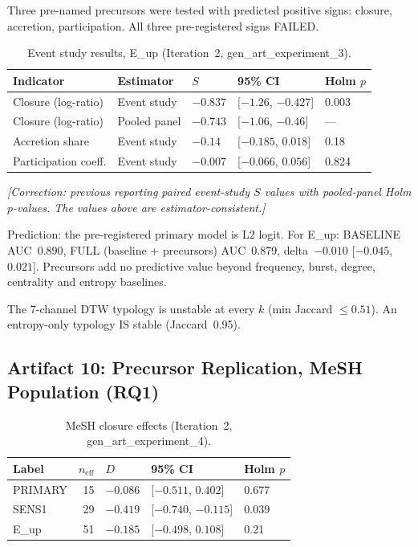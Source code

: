 \documentclass[11pt,letterpaper]{article}
\begin{document}
Three pre-named precursors were tested with predicted positive signs: closure, accretion, participation. All three pre-registered signs FAILED.

\begin{table}[!htbp]
\centering
\caption{Event study results, E\_up (Iteration~2, gen\_art\_experiment\_3).}
\label{tab:event_study}
\begin{tabular}{L{3cm}L{2cm}R{1.3cm}L{3cm}R{1.3cm}}
\toprule
Indicator & Estimator & $S$ & 95\% CI & Holm $p$ \\
\midrule
Closure (log-ratio) & Event study & $-0.837$ & [$-1.26$, $-0.427$] & 0.003 \\
Closure (log-ratio) & Pooled panel & $-0.743$ & [$-1.06$, $-0.46$] & --- \\
Accretion share & Event study & $-0.14$ & [$-0.185$, $0.018$] & 0.18 \\
Participation coeff. & Event study & $-0.007$ & [$-0.066$, $0.056$] & 0.824 \\
\bottomrule
\end{tabular}
\end{table}

\emph{[Correction: previous reporting paired event-study $S$ values with pooled-panel Holm $p$-values. The values above are estimator-consistent.]}

Prediction: the pre-registered primary model is L2 logit. For E\_up: BASELINE AUC~0.890, FULL (baseline + precursors) AUC~0.879, delta~$-0.010$ [$-0.045$, $0.021$]. Precursors add no predictive value beyond frequency, burst, degree, centrality and entropy baselines.

The 7-channel DTW typology is unstable at every $k$ (min Jaccard $\leq 0.51$). An entropy-only typology IS stable (Jaccard~0.95).

\subsection{Artifact 10: Precursor Replication, MeSH Population (RQ1)}

\begin{table}[!htbp]
\centering
\caption{MeSH closure effects (Iteration~2, gen\_art\_experiment\_4).}
\label{tab:mesh_closure}
\begin{tabular}{L{2cm}rR{1.3cm}L{3cm}R{1.3cm}}
\toprule
Label & $n_{\mathrm{eff}}$ & $D$ & 95\% CI & Holm $p$ \\
\midrule
PRIMARY & 15 & $-0.086$ & [$-0.511$, $0.402$] & 0.677 \\
SENS1 & 29 & $-0.419$ & [$-0.740$, $-0.115$] & 0.039 \\
E\_up & 51 & $-0.185$ & [$-0.498$, $0.108$] & 0.21 \\
\bottomrule
\end{tabular}
\end{table}
\end{document}
